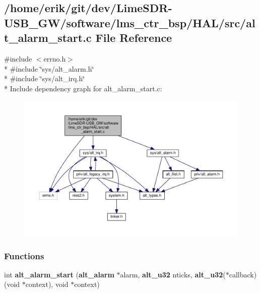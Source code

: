 \subsection{/home/erik/git/dev/\+Lime\+S\+D\+R-\/\+U\+S\+B\+\_\+\+G\+W/software/lms\+\_\+ctr\+\_\+bsp/\+H\+A\+L/src/alt\+\_\+alarm\+\_\+start.c File Reference}
\label{alt__alarm__start_8c}
{\ttfamily \#include $<$errno.\+h$>$}\\*
{\ttfamily \#include \char`\"{}sys/alt\+\_\+alarm.\+h\char`\"{}}\\*
{\ttfamily \#include \char`\"{}sys/alt\+\_\+irq.\+h\char`\"{}}\\*
Include dependency graph for alt\+\_\+alarm\+\_\+start.\+c\+:
\nopagebreak
\begin{figure}[H]
\begin{center}
\leavevmode
\includegraphics[width=350pt]{de/d8c/alt__alarm__start_8c__incl}
\end{center}
\end{figure}
\subsubsection*{Functions}
\begin{DoxyCompactItemize}
\item 
int {\bf alt\+\_\+alarm\+\_\+start} ({\bf alt\+\_\+alarm} $\ast$alarm, {\bf alt\+\_\+u32} nticks, {\bf alt\+\_\+u32}($\ast$callback)(void $\ast$context), void $\ast$context)
\end{DoxyCompactItemize}


